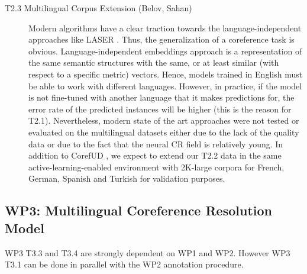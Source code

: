\begin{description}
	\item [T2.3 Multilingual Corpus Extension (Belov, Sahan)] Modern algorithms have a clear traction towards the language-independent approaches like LASER \cite{artetxe2019massively}. 
Thus, the generalization of a coreference task is obvious. Language-independent embeddings approach is a representation of the same semantic structures with the same, or at least similar (with respect to a specific metric) vectors. 
Hence, models trained in English must be able to work with different languages. 
However, in practice, if the model is not fine-tuned with another language that it makes predictions for, the error rate of the predicted instances will be higher (this is the reason for T2.1). 
Nevertheless, modern state of the art approaches were not tested or evaluated on the multilingual datasets either due to the lack of the quality data or due to the fact that the neural CR field is relatively young. 
In addition to CorefUD \cite{cr-mult-Nedoluzhko2021}, we expect to extend our T2.2 data in the same active-learning-enabled environment with 2K-large corpora for French, German, Spanish and Turkish for validation purposes.

\end{description}


\subsection*{WP3: Multilingual Coreference Resolution Model}

WP3 T3.3 and T3.4  are strongly dependent on WP1 and WP2. However WP3 T3.1 can be done in parallel with the WP2 annotation procedure.

